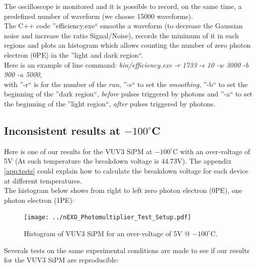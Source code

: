 \documentclass[a4paper, 11pt]{report}%
\begin{document}
  The oscilloscope is monitored and it is possible to record, on the same time, a predefined number of waveform 
  (we choose 15000 waveforms). 
  \\
  
  The C++ code ''efficiency.exe`` smooths a waveform (to decrease the Gaussian noise and increase the ratio Signal/Noise),
  records the minimum of it in each regions and plots an histogram which allows counting the number of 
  zero photon electron (0PE) in the ''light and dark region``.
  \\
  
  Here is an example of line command: \textit{bin/efficiency.exe -r 1733 -s 10 -w 3000 -b 900 -a 5000},\\
  with ''-r`` is for the number 
  of the \textit{run}, ''-s`` to set the \textit{smoothing}, ''-b`` to set the beginning of the ''dark region``, \textit{before} 
  pulses triggered by photons and ''-a`` to set the beginning of the ''light region``, \textit{after} pulses triggered by photons.
  
  
  
  \subsection{Inconsistent results at $-100^\circ$C}
  
  Here is one of our results for the VUV3 SiPM at $-100^\circ$C with an over-voltage of 5V (At such temperature the breakdown voltage 
  is 44.73V). The appendix \ref{app:tests} could explain how to calculate the breakdown voltage for each device at different temperatures. 
  \\
  
  The histogram below shows from right to left zero photon electron (0PE), one photon electron (1PE):   
  
  \newpage

  \begin{figure}[!hbtp]
    \centering
    \texttt{[image: ../nEXO\_Photomultiplier\_Test\_Setup.pdf]} 
    \caption{Histogram of VUV3 SiPM for an over-voltage of 5V @ $-100^\circ$C.}
    \label{fig:histo_PE}
  \end{figure}

  
  Severals tests on the same experimental conditions are made to see if our results for the VUV3 SiPM are reproducible:
  
\end{document}
